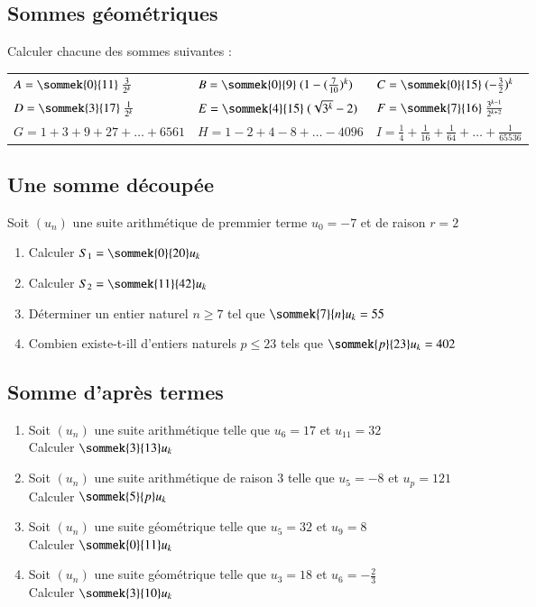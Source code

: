 \documentclass[oneside,12pt]{article}          %
\begin{document}
\subsection{Sommes géométriques}
Calculer chacune des sommes suivantes :

\renewcommand{\arraystretch}{2.5}
\begin{tabular}{p{} p{} p{}}
    $A=\sommek{0}{11}~\frac{3}{2^{k}}$ & $B=\sommek{0}{9}~(1-(\frac{7}{10})^{k}) $ & $C=\sommek{0}{15}~(-\frac{3}{2})^{k} $ \\
    $D=\sommek{3}{17}~\frac{1}{2^{k}} $ & $E=\sommek{4}{15}~(\sqrt{3^{k}}-2) $ & $F=\sommek{7}{16} ~\frac{3^{k-1}}{2^{k+2}}$ \\
     $G=1+3+9+27+\ldots+6561$ & $H=1-2+4-8+\ldots-4096$ & $I=\frac{1}{4}+\frac{1}{16}+\frac{1}{64}+\ldots+\frac{1}{65536}$    
\end{tabular}



\subsection{Une somme découpée}
Soit $(u_n)$ une suite arithmétique de premmier terme $u_0=-7$ et de raison $r=2$
\begin{enumerate}
    \item Calculer $S_1=\sommek{0}{20}u_k$
    \item Calculer $S_2=\sommek{11}{42}u_k$
    \item Déterminer un entier naturel $n\geq7$ tel que $\sommek{7}{n}u_k=55$
    \item Combien existe-t-ill d'entiers naturels $p\leq23$ tels que $\sommek{p}{23}u_k=402$
\end{enumerate}



\subsection{Somme d'après termes}
\begin{enumerate}
	\item Soit $(u_n)$ une suite arithmétique telle que $u_6=17$ et $u_{11}=32$\\
	Calculer $\sommek{3}{13}u_k$
	\item Soit $(u_n)$ une suite arithmétique de raison 3 telle que $u_5=-8$ et $u_p=121$ \\
	Calculer $\sommek{5}{p}u_k$
	\item Soit $(u_n)$ une suite géométrique telle que $u_5=32$ et $u_9=8$ \\
	Calculer $\sommek{0}{11}u_k$
	\item Soit $(u_n)$ une suite géométrique telle que $u_3=18$ et $u_6=-\frac{2}{3}$ \\
	Calculer $\sommek{3}{10}u_k$
\end{enumerate}
\end{document}
